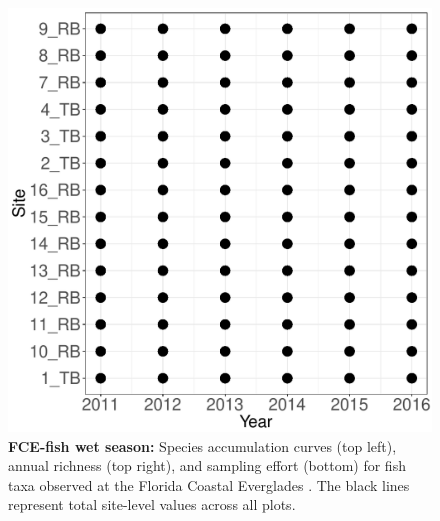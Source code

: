 \documentclass[11pt, oneside]{article}
\begin{document}
\begin{figure}[h!]
\includegraphics[scale = 0.4]{fce-fish-RehageWet_spatiotemporal_sampling_effort.pdf}
\caption{{\bf FCE-fish wet season:} Species accumulation curves (top left),  annual richness (top right), and sampling effort (bottom)  for fish taxa observed at the Florida Coastal Everglades . The black lines represent total site-level values across all plots.}
\label{fce-fish-wet}
\end{figure}



\end{document}
